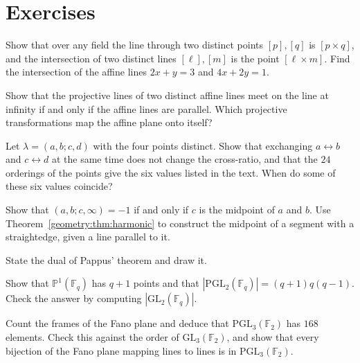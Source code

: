 \section{Exercises}

\begin{exercise}[$\star$]\label{geometry:ex:crossproduct}
Show that over any field the line through two distinct points $[p],[q]$ is $[p\times q]$, and the intersection of two distinct lines $[\ell],[m]$
is the point $[\ell\times m]$. Find the intersection of the affine lines $2x+y=3$ and $4x+2y=1$.
\end{exercise}

\begin{exercise}[$\star$]\label{geometry:ex:parallelinf}
Show that the projective lines of two distinct affine lines meet on the line at infinity if and only if the affine lines are parallel. Which
projective transformations map the affine plane onto itself?
\end{exercise}

\begin{exercise}[$\star$]\label{geometry:ex:sixvalues}
Let $\lambda=(a,b;c,d)$ with the four points distinct. Show that exchanging $a\leftrightarrow b$ and $c\leftrightarrow d$ at the same time
does not change the cross-ratio, and that the $24$ orderings of the points give the six values listed in the text. When do some of these six
values coincide?
\end{exercise}

\begin{exercise}[$\star$]\label{geometry:ex:harmonicmidpoint}
Show that $(a,b;c,\infty)=-1$ if and only if $c$ is the midpoint of $a$ and $b$. Use Theorem~\ref{geometry:thm:harmonic} to construct the midpoint of a
segment with a straightedge, given a line parallel to it.
\end{exercise}

\begin{exercise}[$\star$]\label{geometry:ex:dualpappus}
State the dual of Pappus' theorem and draw it.
\end{exercise}

\begin{exercise}[$\star$]\label{geometry:ex:projline}
Show that $\mathbb P^1(\mathbb F_q)$ has $q+1$ points and that $|\mathrm{PGL}_2(\mathbb F_q)|=(q+1)q(q-1)$. Check the answer by computing
$|\mathrm{GL}_2(\mathbb F_q)|$.
\end{exercise}

\begin{exercise}[$\star\star$]\label{geometry:ex:fano168}
Count the frames of the Fano plane and deduce that $\mathrm{PGL}_3(\mathbb F_2)$ has $168$ elements. Check this against the order of
$\mathrm{GL}_3(\mathbb F_2)$, and show that every bijection of the Fano plane mapping lines to lines is in $\mathrm{PGL}_3(\mathbb F_2)$.
\end{exercise}


